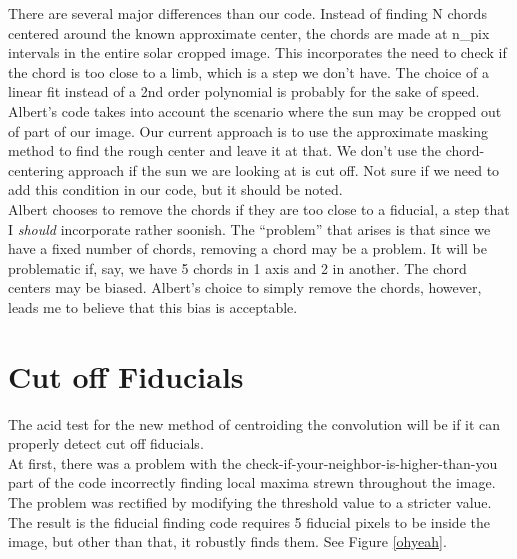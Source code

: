 \documentclass[10pt]{scrartcl}
\begin{document}
There are several major differences than our code. Instead of finding N chords centered around the known approximate center, the chords are made at n\_pix intervals in the entire solar cropped image. This incorporates the need to check if the chord is too close to a limb, which is a step we don't have. The choice of a linear fit instead of a 2nd order polynomial is probably for the sake of speed. \\

Albert's code takes into account the scenario where the sun may be cropped out of part of our image. Our current approach is to use the approximate masking method to find the rough center and leave it at that. We don't use the chord-centering approach if the sun we are looking at is cut off. Not sure if we need to add this condition in our code, but it should be noted.\\

Albert chooses to remove the chords if they are too close to a fiducial, a step that I \emph{should} incorporate rather soonish. The ``problem'' that arises is that since we have a fixed number of chords, removing a chord may be a problem. It will be problematic if, say, we have 5 chords in 1 axis and 2 in another. The chord centers may be biased. Albert's choice to simply remove the chords, however, leads me to believe that this bias is acceptable. 

\section{Cut off Fiducials} %
\label{sec:cut_off_fiducials}
The acid test for the new method of centroiding the convolution will be if it can properly detect cut off fiducials. \\

At first, there was a problem with the check-if-your-neighbor-is-higher-than-you part of the code incorrectly finding local maxima strewn throughout the image. The problem was rectified by modifying the threshold value to a stricter value. The result is the fiducial finding code requires 5 fiducial pixels to be inside the image, but other than that, it robustly finds them. See Figure \ref{ohyeah}.

\end{document}
